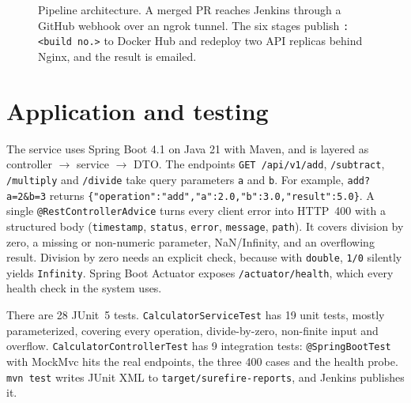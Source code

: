 \documentclass[10pt,a4paper]{article}
\newcommand{\cmd}[1]{\texttt{#1}}
\begin{document}
\begin{figure}[H]
\caption{Pipeline architecture. A merged PR reaches Jenkins through a GitHub webhook over an ngrok tunnel. The six stages publish \cmd{:<build no.>} to Docker Hub and redeploy two API replicas behind Nginx, and the result is emailed.}
\label{fig:arch}
\end{figure}

\section{Application and testing}
The service uses Spring Boot 4.1 on Java 21 with Maven, and is layered as controller $\to$ service $\to$ DTO.
The endpoints \cmd{GET /api/v1/add}, \cmd{/subtract}, \cmd{/multiply} and \cmd{/divide} take query parameters \cmd{a} and \cmd{b}. For example, \cmd{add?a=2\&b=3} returns
\cmd{\{"operation":"add","a":2.0,"b":3.0,"result":5.0\}}.
A single \cmd{@RestControllerAdvice} turns every client error into HTTP~400 with a structured body (\cmd{timestamp}, \cmd{status}, \cmd{error}, \cmd{message}, \cmd{path}). It covers division by zero, a missing or non-numeric parameter, NaN/Infinity, and an overflowing result.
Division by zero needs an explicit check, because with \cmd{double}, \cmd{1/0} silently yields \cmd{Infinity}. Spring Boot Actuator exposes \cmd{/actuator/health}, which every health check in the system uses.

There are 28 JUnit~5 tests. \cmd{CalculatorServiceTest} has 19 unit tests, mostly parameterized, covering every operation, divide-by-zero, non-finite input and overflow. \cmd{CalculatorControllerTest} has 9 integration tests: \cmd{@SpringBootTest} with MockMvc hits the real endpoints, the three 400 cases and the health probe.
\cmd{mvn test} writes JUnit XML to \cmd{target/surefire-reports}, and Jenkins publishes it.
\end{document}
